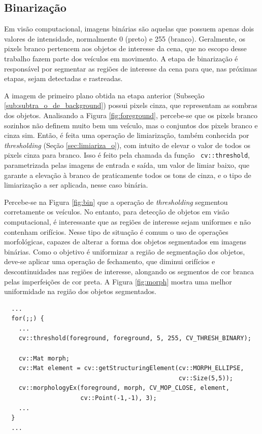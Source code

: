 
\subsection{Binarização} %
\label{sub:binariza_o}

Em visão computacional, imagens binárias são aquelas que possuem apenas dois valores de intensidade, normalmente 0 (preto) e 255 (branco). Geralmente, os pixels branco pertencem aos objetos de interesse da cena, que no escopo desse trabalho fazem parte dos veículos em movimento. A etapa de binarização é responsável por segmentar as regiões de interesse da cena para que, nas próximas etapas, sejam detectadas e rastreadas.

A imagem de primeiro plano obtida na etapa anterior (Subseção \ref{sub:subtra_o_de_background}) possui pixels cinza, que representam as sombras dos objetos. Analisando a Figura \ref{fig:foreground}, percebe-se que os pixels branco sozinhos não definem muito bem um veículo, mas o conjuntos dos pixels branco e cinza sim. Então, é feita uma operação de limiarização, também conhecida por \textit{thresholding} (Seção \ref{sec:limiariza_o}), com intuito de elevar o valor de todos os pixels cinza para branco. Isso é feito pela chamada da função \verb! cv::threshold!, parametrizada pelas imagens de entrada e saída, um valor de limiar baixo, que garante a elevação à branco de praticamente todos os tons de cinza, e o tipo de limiarização a ser aplicada, nesse caso binária. 

Percebe-se na Figura \ref{fig:bin} que a operação de \textit{thresholding} segmentou corretamente os veículos. No entanto, para detecção de objetos em visão computacional, é interessante que as regiões de interesse sejam uniformes e não contenham orifícios. Nesse tipo de situação é comum o uso de operações morfológicas, capazes de alterar a forma dos objetos segmentados em imagens binárias. Como o objetivo é uniformizar a região de segmentação dos objetos, deve-se aplicar uma operação de fechamento, que diminui orifícios e descontinuidades nas regiões de interesse, alongando os segmentos de cor branca pelas imperfeições de cor preta. A Figura \ref{fig:morph} mostra uma melhor uniformidade na região dos objetos segmentados.

\begin{lstlisting}
  ...
  for(;;) {
    ...
    cv::threshold(foreground, foreground, 5, 255, CV_THRESH_BINARY);

    cv::Mat morph;
    cv::Mat element = cv::getStructuringElement(cv::MORPH_ELLIPSE,
                                                cv::Size(5,5));
    cv::morphologyEx(foreground, morph, CV_MOP_CLOSE, element, 
                     cv::Point(-1,-1), 3);
    ...
  }
  ...  
\end{lstlisting}

